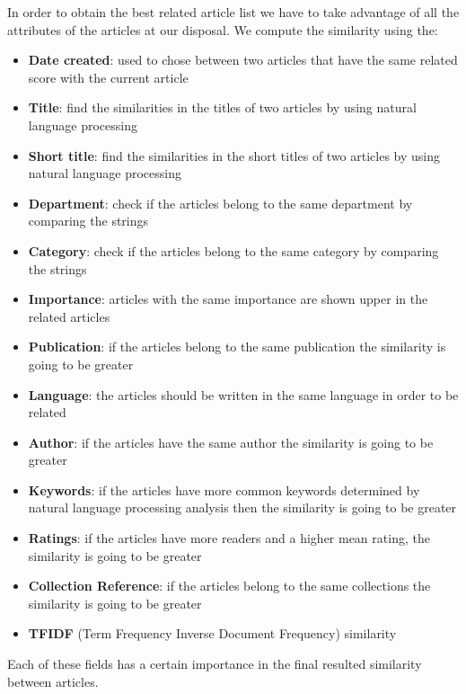 In order to obtain the best related article list we have to take advantage of all the attributes of the articles at our disposal.
We compute the similarity using the:
\begin{itemize}
	\item \textbf{Date created}: used to chose between two articles that have the same related score with the current article
	\item \textbf{Title}: find the similarities in the titles of two articles by using natural language processing
	\item \textbf{Short title}: find the similarities in the short titles of two articles by using natural language processing
	\item \textbf{Department}: check if the articles belong to the same department by comparing the strings
	\item \textbf{Category}: check if the articles belong to the same category by comparing the strings
	\item \textbf{Importance}: articles with the same importance are shown upper in the related articles
	\item \textbf{Publication}: if the articles belong to the same publication the similarity is going to be greater
	\item \textbf{Language}: the articles should be written in the same language in order to be related
	\item \textbf{Author}: if the articles have the same author the similarity is going to be greater
	\item \textbf{Keywords}: if the articles have more common keywords determined by natural language processing analysis then the similarity is going to be greater
	\item \textbf{Ratings}: if the articles have more readers and a higher mean rating, the similarity is going to be greater
	\item \textbf{Collection Reference}: if the articles belong to the same collections the similarity is going to be greater
	\item \textbf{TFIDF} (Term Frequency Inverse Document Frequency) similarity
\end{itemize}
Each of these fields has a certain importance in the final resulted similarity between articles.

